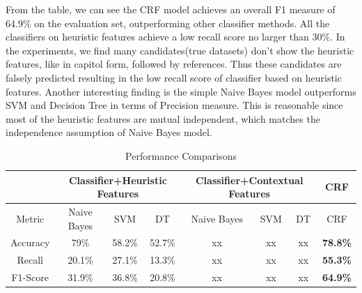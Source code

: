 \documentclass[10pt]{article}
\begin{document}
From the table, we can see the CRF model achieves an overall F1 measure of 64.9\% on the evaluation set, outperforming other classifier methods. All the classifiers on heuristic features achieve a low recall score no larger than 30\%. In the experiments, we find many candidates(true datasets) don't show the heuristic features, like in capitol form, followed by references. Thus these candidates are falsely predicted resulting in the low recall score of classifier based on heuristic features. Another interesting finding is the simple Naive Bayes model outperforms SVM and Decision Tree in terms of Precision measure. This is reasonable since most of the heuristic features are mutual independent, which matches the independence assumption of Naive Bayes model. 
\begin{table}
\centering
\hspace{-1cm}
\scriptsize
\vspace{0pt}
\begin{tabular}{|c @{\hskip 0.02in}| c c c @{\hskip 0.1in}| c c c @{\hskip 0.1in}| c |} %
	\hline %
	 & \multicolumn{3}{c|}{Classifier+Heuristic Features} & \multicolumn{3}{c|}{Classifier+Contextual Features} & \multicolumn{1}{c|}{CRF} \\
	\hline
	 Metric & Naive Bayes & SVM & DT & Naive Bayes & SVM & DT & CRF  \\ [0.2ex] %
	\hline \hline
	Accuracy & 79\% & 58.2\% & 52.7\% & xx & xx & xx & \textbf{78.8\%} \\
	\hline
	 Recall & 20.1\% & 27.1\% & 13.3\% & xx & xx & xx & \textbf{55.3\%} \\
	\hline
	F1-Score & 31.9\% & 36.8\% & 20.8\% & xx & xx & xx & \textbf{64.9\%} \\
	\hline %
	\end{tabular} 
	\caption{Performance Comparisons}
	\label{table:comparison} %
\end{table} 
\end{document}
